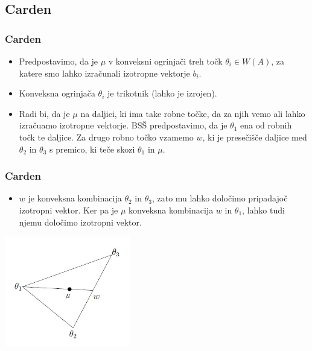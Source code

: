 \documentclass{beamer}
\begin{document}
\subsection{Carden}
\begin{frame}
\frametitle{Carden}

\begin{itemize}
\item Predpostavimo, da je $\mu$ v konveksni ogrinjači treh točk $\theta_i \in W(A)$, za katere smo lahko izračunali izotropne vektorje $b_i$. 
\item Konveksna ogrinjača $\theta_i$ je trikotnik (lahko je izrojen).
\item Radi bi, da je $\mu$ na daljici, ki ima take robne točke, da za njih vemo ali lahko izračuamo izotropne vektorje. BSŠ predpostavimo, da je $\theta_1$ ena od robnih točk te daljice. Za drugo robno točko vzamemo $w$, ki je presečišče daljice med $\theta_2$ in $\theta_3$ s premico, ki teče skozi $\theta_1$ in $\mu$.
\end{itemize}
\end{frame}
\begin{frame}
\frametitle{Carden}
\begin{itemize}
\item $w$ je konveksna kombinacija $\theta_2$ in $\theta_3$, zato mu lahko določimo pripadajoč izotropni vektor. Ker pa je $\mu$ konveksna kombinacija $w$ in $\theta_1$, lahko tudi njemu določimo izotropni vektor.
\end{itemize}
\begin{center}
\includegraphics[width=5.5cm]{triangle.jpg}
\end{center}
\end{frame}
\end{document}
